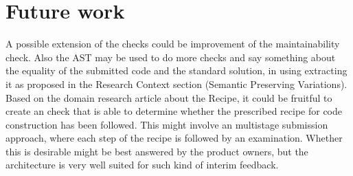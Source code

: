 \section{Future work}
A possible extension of the \glspl{check} could be improvement of the
maintainability check.
Also the AST may be used to do more \glspl{check} and say something about the
equality of the submitted code and the standard solution, in using extracting it
as proposed in the Research Context section (Semantic Preserving Variations). 
Based on the domain research article about the Recipe, it could be fruitful to 
create an \gls{check} 
that is able to determine whether the prescribed recipe for code construction 
has been followed. This might involve an multistage submission approach, where 
each step of the recipe is followed by an examination. Whether this is desirable
might be best answered by the product owners, but the architecture is very well
suited for such kind of interim feedback.

